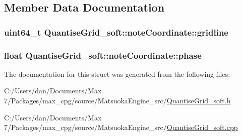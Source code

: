 \subsection{Member Data Documentation}
\subsubsection[{\texorpdfstring{gridline}{gridline}}]{\setlength{\rightskip}{0pt plus 5cm}uint64\+\_\+t Quantise\+Grid\+\_\+soft\+::note\+Coordinate\+::gridline}\hypertarget{structQuantiseGrid__soft_1_1noteCoordinate_a21b822d390f01aba9aa1fed2d5cc8a08}{}\label{structQuantiseGrid__soft_1_1noteCoordinate_a21b822d390f01aba9aa1fed2d5cc8a08}
\subsubsection[{\texorpdfstring{phase}{phase}}]{\setlength{\rightskip}{0pt plus 5cm}float Quantise\+Grid\+\_\+soft\+::note\+Coordinate\+::phase}\hypertarget{structQuantiseGrid__soft_1_1noteCoordinate_aee66a62adac6ba5afdd8a20fa28bf2be}{}\label{structQuantiseGrid__soft_1_1noteCoordinate_aee66a62adac6ba5afdd8a20fa28bf2be}


The documentation for this struct was generated from the following files\+:\begin{DoxyCompactItemize}
\item 
C\+:/\+Users/dan/\+Documents/\+Max 7/\+Packages/max\+\_\+cpg/source/\+Matsuoka\+Engine\+\_\+src/\hyperlink{QuantiseGrid__soft_8h}{Quantise\+Grid\+\_\+soft.\+h}\item 
C\+:/\+Users/dan/\+Documents/\+Max 7/\+Packages/max\+\_\+cpg/source/\+Matsuoka\+Engine\+\_\+src/\hyperlink{QuantiseGrid__soft_8cpp}{Quantise\+Grid\+\_\+soft.\+cpp}\end{DoxyCompactItemize}
